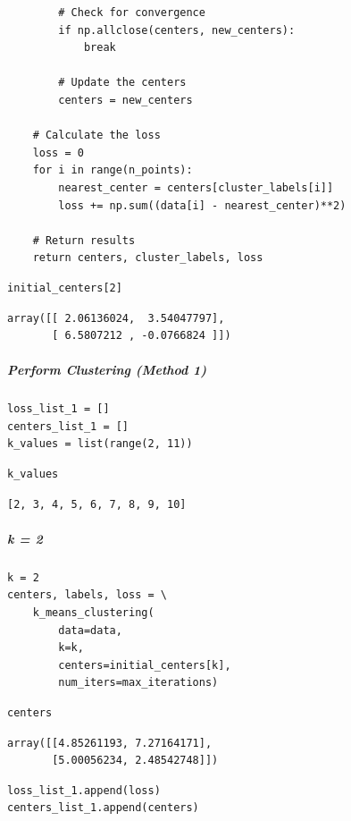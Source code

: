 \begin{verbatim}
        # Check for convergence
        if np.allclose(centers, new_centers):
            break

        # Update the centers
        centers = new_centers

    # Calculate the loss
    loss = 0
    for i in range(n_points):
        nearest_center = centers[cluster_labels[i]]
        loss += np.sum((data[i] - nearest_center)**2)

    # Return results
    return centers, cluster_labels, loss
\end{verbatim}

\begin{verbatim}
initial_centers[2]
\end{verbatim}

\begin{verbatim}
array([[ 2.06136024,  3.54047797],
       [ 6.5807212 , -0.0766824 ]])
\end{verbatim}

\subparagraph{Perform Clustering (Method 1)}

\begin{verbatim}
loss_list_1 = []
centers_list_1 = []
k_values = list(range(2, 11))
\end{verbatim}

\begin{verbatim}
k_values
\end{verbatim}

\begin{verbatim}
[2, 3, 4, 5, 6, 7, 8, 9, 10]
\end{verbatim}

\subparagraph{k = 2}

\begin{verbatim}
k = 2
centers, labels, loss = \
    k_means_clustering(
        data=data,
        k=k,
        centers=initial_centers[k],
        num_iters=max_iterations)
\end{verbatim}

\begin{verbatim}
centers
\end{verbatim}

\begin{verbatim}
array([[4.85261193, 7.27164171],
       [5.00056234, 2.48542748]])
\end{verbatim}

\begin{verbatim}
loss_list_1.append(loss)
centers_list_1.append(centers)
\end{verbatim}

